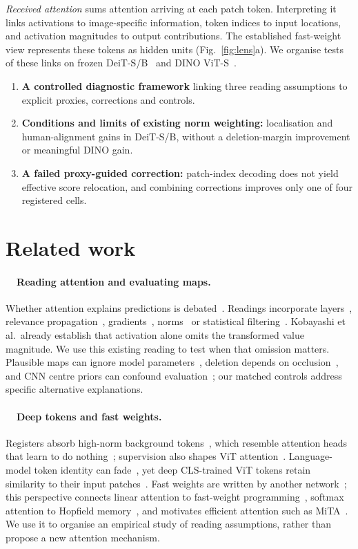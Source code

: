 \documentclass{article}
\newcommand{\rsub}[1]{\refstepcounter{subsection}\paragraph{\thesubsection~~#1}}
\begin{document}
\emph{Received attention} sums attention arriving at each patch token. Interpreting it links activations to image-specific information, token indices to input locations, and activation magnitudes to output contributions. The established fast-weight view represents these tokens as hidden units (Fig.~\ref{fig:lens}a). We organise tests of these links on frozen DeiT-S/B~\citep{touvron2021} and DINO ViT-S~\citep{caron2021}.
\begin{enumerate}[nosep,leftmargin=1.7em,label=(\arabic*)]
\item \textbf{A controlled diagnostic framework} linking three reading assumptions to explicit proxies, corrections and controls.
\item \textbf{Conditions and limits of existing norm weighting:} localisation and human-alignment gains in DeiT-S/B, without a deletion-margin improvement or meaningful DINO gain.
\item \textbf{A failed proxy-guided correction:} patch-index decoding does not yield effective score relocation, and combining corrections improves only one of four registered cells.
\end{enumerate}



\section{Related work}
\label{sec:related}
\rsub{Reading attention and evaluating maps.} Whether attention explains predictions is debated~\citep{jain2019,wiegreffe2019}. Readings incorporate layers~\citep{abnar2020}, relevance propagation~\citep{chefer2021}, gradients~\citep{chefer2021generic}, norms~\citep{kobayashi2020,zhu2024} or statistical filtering~\citep{ayyar2025}. Kobayashi et al.\ already establish that activation alone omits the transformed value magnitude. We use this existing reading to test when that omission matters. Plausible maps can ignore model parameters~\citep{adebayo2018}, deletion depends on occlusion~\citep{bluecher2024}, and CNN centre priors can confound evaluation~\citep{kuang2026}; our matched controls address specific alternative explanations.

\rsub{Deep tokens and fast weights.} Registers absorb high-norm background tokens~\citep{darcet2024,jiang2025}, which resemble attention heads that learn to do nothing~\citep{bondarenko2023}; supervision also shapes ViT attention~\citep{walmer2023}. Language-model token identity can fade~\citep{brunner2020}, yet deep CLS-trained ViT tokens retain similarity to their input patches~\citep{raghu2021}. Fast weights are written by another network~\citep{schmidhuber1992}; this perspective connects linear attention to fast-weight programming~\citep{schlag2021}, softmax attention to Hopfield memory~\citep{ramsauer2021}, and motivates efficient attention such as MiTA~\citep{wen2026mita}. We use it to organise an empirical study of reading assumptions, rather than propose a new attention mechanism.
\end{document}
